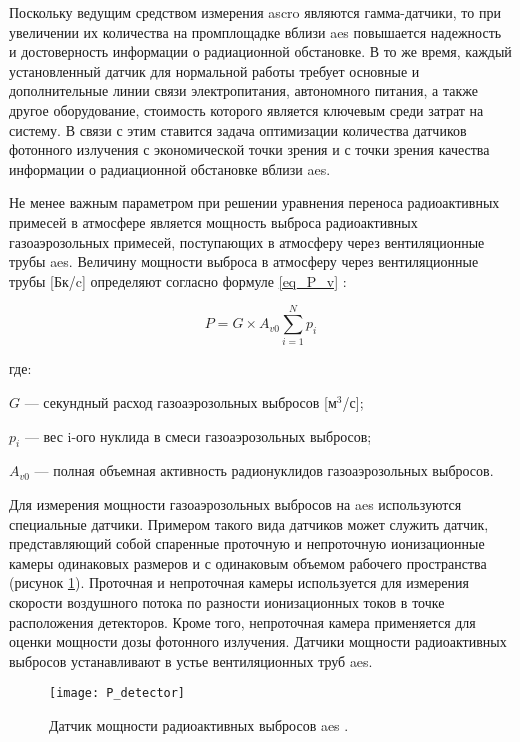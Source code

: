 Поскольку ведущим средством измерения \ac{ascro} являются гамма-датчики, то при увеличении их количества на промплощадке 
вблизи \ac{aes} повышается надежность и достоверность информации о радиационной обстановке. В то же время, каждый 
установленный датчик для нормальной работы требует основные и дополнительные линии связи электропитания, автономного 
питания, а также другое оборудование, стоимость которого является ключевым среди затрат на систему. В связи с этим 
ставится задача оптимизации количества датчиков фотонного излучения с экономической точки зрения и с точки зрения 
качества информации о радиационной обстановке вблизи \ac{aes}.

Не менее важным параметром при решении уравнения переноса радиоактивных примесей в атмосфере является мощность выброса 
радиоактивных газоаэрозольных примесей, поступающих в атмосферу через вентиляционные трубы \ac{aes}. Величину мощности 
выброса в атмосферу через вентиляционные трубы [Бк/c] определяют согласно формуле \ref{eq_P_v} \cite{elokhin}:

\begin{equation}
    \label{eq_P_v}
    P = G \times A_{v0} \sum_{i=1}^{N} p_i
\end{equation}

где:
\begin{description}
    \item $G$ --- секундный расход газоаэрозольных выбросов [м$^3$/с];
    \item $p_i$ --- вес i-ого нуклида в смеси газоаэрозольных выбросов;
    \item $A_{v0}$ --- полная объемная активность радионуклидов газоаэрозольных выбросов.
\end{description}

Для измерения мощности газоаэрозольных выбросов на \ac{aes} используются специальные датчики. Примером такого вида 
датчиков может служить датчик, представляющий собой спаренные проточную и непроточную ионизационные камеры одинаковых 
размеров и с одинаковым объемом рабочего пространства (рисунок \ref{fig_P_detector}). Проточная и непроточная камеры 
используется для измерения скорости воздушного потока по разности ионизационных токов в точке расположения детекторов. 
Кроме того, непроточная камера применяется для оценки мощности дозы фотонного излучения. Датчики мощности радиоактивных 
выбросов устанавливают в устье вентиляционных труб \ac{aes}.

\begin{figure}[ht!]
	\centering
	\texttt{[image: P\_detector]}
	\captionsetup{justification=centering}
    \caption{Датчик мощности радиоактивных выбросов \ac{aes} \cite{elokhin}.}
    \label{fig_P_detector}
\end{figure}

